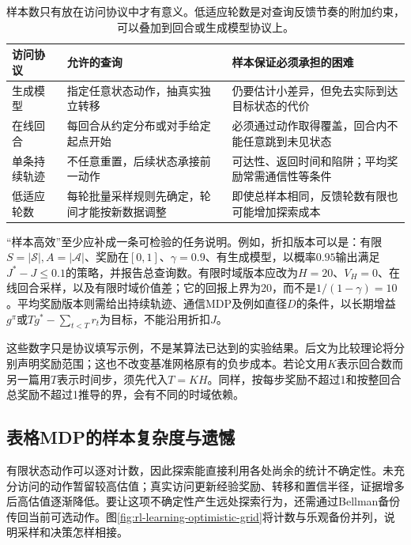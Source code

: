\begin{table}[t]
  \centering
  \small
  \begin{tabularx}{\linewidth}{>{\raggedright\arraybackslash}p{25mm} >{\raggedright\arraybackslash}X >{\raggedright\arraybackslash}X}
    \toprule
    访问协议 & 允许的查询 & 样本保证必须承担的困难 \\
    \midrule
    生成模型 & 指定任意状态动作，抽真实独立转移 & 仍要估计小差异，但免去实际到达目标状态的代价 \\
    在线回合 & 每回合从约定分布或对手给定起点开始 & 必须通过动作取得覆盖，回合内不能任意跳到未见状态 \\
    单条持续轨迹 & 不任意重置，后续状态承接前一动作 & 可达性、返回时间和陷阱；平均奖励常需通信性等条件 \\
    低适应轮数 & 每轮批量采样规则先确定，轮间才能按新数据调整 & 即使总样本相同，反馈轮数有限也可能增加探索成本 \\
    \bottomrule
  \end{tabularx}
  \caption{样本数只有放在访问协议中才有意义。低适应轮数是对查询反馈节奏的附加约束，可以叠加到回合或生成模型协议上。}
  \label{tab:rl-learning-access-models}
\end{table}

“样本高效”至少应补成一条可检验的任务说明。例如，折扣版本可以是：有限$S=|\mathcal S|,A=|\mathcal A|$、奖励在$[0,1]$、$\gamma=0.9$、有生成模型，以概率$0.95$输出满足$J^*-J\leq0.1$的策略，并报告总查询数。有限时域版本应改为$H=20$、$V_H=0$、在线回合采样，以及有限时域价值差；它的回报上界为20，而不是$1/(1-\gamma)=10$。平均奖励版本则需给出持续轨迹、通信MDP及例如直径$D$的条件，以长期增益$g^\pi$或$Tg^*-\sum_{t<T}r_t$为目标，不能沿用折扣$J$。

这些数字只是协议填写示例，不是某算法已达到的实验结果。后文为比较理论将分别声明奖励范围；这也不改变基准网格原有的负步成本。若论文用$K$表示回合数而另一篇用$T$表示时间步，须先代入$T=KH$。同样，按每步奖励不超过1和按整回合总奖励不超过1推导的界，会有不同的时域依赖。

\subsection{表格MDP的样本复杂度与遗憾}
\label{sec:rl-learning-tabular-complexity}

有限状态动作可以逐对计数，因此探索能直接利用各处尚余的统计不确定性。未充分访问的动作暂留较高估值；真实访问更新经验奖励、转移和置信半径，证据增多后高估值逐渐降低。要让这项不确定性产生远处探索行为，还需通过Bellman备份传回当前可选动作。图\ref{fig:rl-learning-optimistic-grid}将计数与乐观备份并列，说明采样和决策怎样相接。

